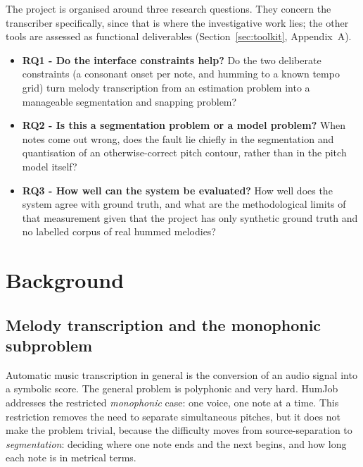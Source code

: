 \documentclass[12pt,a4paper]{article}
\begin{document}
The project is organised around three research questions. They concern the
transcriber specifically, since that is where the investigative work lies; the
other tools are assessed as functional deliverables
(Section~\ref{sec:toolkit}, Appendix~A).

\begin{itemize}
    \item \textbf{RQ1 - Do the interface constraints help?} Do the two
    deliberate constraints (a consonant onset per note, and humming to a known
    tempo grid) turn melody transcription from an estimation problem into a
    manageable segmentation and snapping problem?
    \item \textbf{RQ2 - Is this a segmentation problem or a model problem?}
    When notes come out wrong, does the fault lie chiefly in the segmentation
    and quantisation of an otherwise-correct pitch contour, rather than in the
    pitch model itself?
    \item \textbf{RQ3 - How well can the system be evaluated?} How well does
    the system agree with ground truth, and what are the methodological limits
    of that measurement given that the project has only synthetic ground truth
    and no labelled corpus of real hummed melodies?
\end{itemize}

\section{Background}

\subsection{Melody transcription and the monophonic subproblem}

Automatic music transcription in general is the conversion of an audio signal
into a symbolic score. The general problem is polyphonic and very hard. HumJob
addresses the restricted \emph{monophonic} case: one voice, one note at a time.
This restriction removes the need to separate simultaneous pitches, but it does
not make the problem trivial, because the difficulty moves from
source-separation to \emph{segmentation}: deciding where one note ends and the
next begins, and how long each note is in metrical terms.
\end{document}
